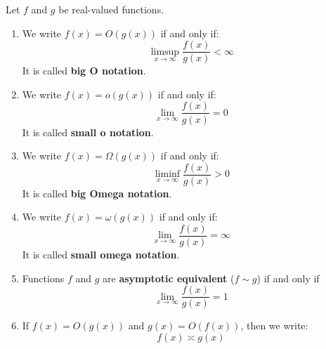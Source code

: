 \documentclass{huhtakm-template-book}
\begin{document}
\begin{defn}
	Let $f$ and $g$ be real-valued functions.
	\begin{enumerate}
		\item We write $f(x)=O(g(x))$ if and only if:
		\begin{equation*}
			\limsup_{x\to\infty}\frac{f(x)}{g(x)}<\infty
		\end{equation*}
		It is called \textbf{big O notation}.
		\item We write $f(x)=o(g(x))$ if and only if:
		\begin{equation*}
			\lim_{x\to\infty}\frac{f(x)}{g(x)}=0
		\end{equation*}
		It is called \textbf{small o notation}.
		\item We write $f(x)=\Omega(g(x))$ if and only if:
		\begin{equation*}
			\liminf_{x\to\infty}\frac{f(x)}{g(x)}>0
		\end{equation*}
		It is called \textbf{big Omega notation}.
		\item We write $f(x)=\omega(g(x))$ if and only if:
		\begin{equation*}
			\lim_{x\to\infty}\frac{f(x)}{g(x)}=\infty
		\end{equation*}
		It is called \textbf{small omega notation}.
		\item Functions $f$ and $g$ are \textbf{asymptotic equivalent} ($f\sim g$) if and only if
		\begin{equation*}
			\lim_{x\to\infty}\frac{f(x)}{g(x)}=1
		\end{equation*}
		\item If $f(x)=O(g(x))$ and $g(x)=O(f(x))$, then we write:
		\begin{equation*}
			f(x)\asymp g(x)
		\end{equation*}
	\end{enumerate}
\end{defn}
\end{document}
